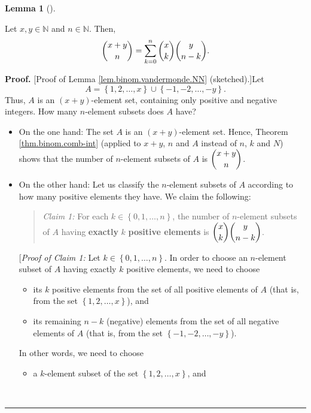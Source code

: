 \documentclass[numbers=enddot,12pt,final,onecolumn,notitlepage]{scrartcl}%
\numberwithin{exer}{subsection}
\theoremstyle{definition}
\newtheorem{lem}[theo]{Lemma}
\newenvironment{lemma}[1][]
{\begin{lem}[#1]\begin{leftbar}}
{\end{leftbar}\end{lem}}
\newenvironment{statement}{\begin{quote}}{\end{quote}}
\newenvironment{proof}[1][Proof]{\noindent\textbf{#1.} }{\ \rule{0.5em}{0.5em}}
\let\sumnonlimits\sum
\renewcommand{\sum}{\sumnonlimits\limits}
\begin{document}
\begin{lemma}
\label{lem.binom.vandermonde.NN}Let $x,y\in\mathbb{N}$ and $n\in\mathbb{N}$.
Then,%
\[
\dbinom{x+y}{n}=\sum_{k=0}^{n}\dbinom{x}{k}\dbinom{y}{n-k}.
\]

\end{lemma}

\begin{proof}
[Proof of Lemma \ref{lem.binom.vandermonde.NN} (sketched).]Let%
\[
A=\left\{  1,2,\ldots,x\right\}  \cup\left\{  -1,-2,\ldots,-y\right\}  .
\]
Thus, $A$ is an $\left(  x+y\right)  $-element set, containing only positive
and negative integers. How many $n$-element subsets does $A$ have?

\begin{itemize}
\item On the one hand: The set $A$ is an $\left(  x+y\right)  $-element set.
Hence, Theorem \ref{thm.binom.comb-int} (applied to $x+y$, $n$ and $A$ instead
of $n$, $k$ and $N$) shows that the number of $n$-element subsets of $A$ is
$\dbinom{x+y}{n}$.

\item On the other hand: Let us classify the $n$-element subsets of $A$
according to how many positive elements they have. We claim the following:

\begin{statement}
\textit{Claim 1:} For each $k\in\left\{  0,1,\ldots,n\right\}  $, the number
of $n$-element subsets of $A$ having \textbf{exactly }$k$ \textbf{positive
elements} is $\dbinom{x}{k}\dbinom{y}{n-k}$.
\end{statement}

[\textit{Proof of Claim 1:} Let $k\in\left\{  0,1,\ldots,n\right\}  $. In
order to choose an $n$-element subset of $A$ having exactly $k$ positive
elements, we need to choose

\begin{itemize}
\item its $k$ positive elements from the set of all positive elements of $A$
(that is, from the set $\left\{  1,2,\ldots,x\right\}  $), and

\item its remaining $n-k$ (negative) elements from the set of all negative
elements of $A$ (that is, from the set $\left\{  -1,-2,\ldots,-y\right\}  $).
\end{itemize}

In other words, we need to choose

\begin{itemize}
\item a $k$-element subset of the set $\left\{  1,2,\ldots,x\right\}  $, and


\end{itemize}
\end{itemize}
\end{proof}
\end{document}
